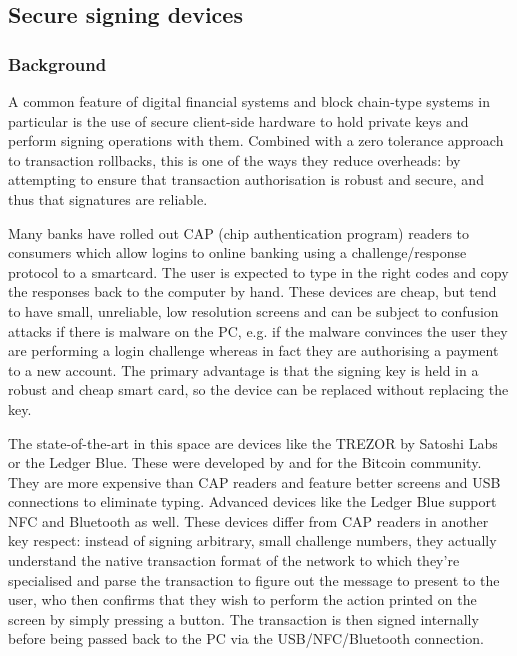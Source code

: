 \documentclass{article}
\begin{document}
\subsection{Secure signing devices}\label{sec:secure-signing-devices}

\subsubsection{Background}

A common feature of digital financial systems and block chain-type systems in particular is the use of secure
client-side hardware to hold private keys and perform signing operations with them. Combined with a zero tolerance
approach to transaction rollbacks, this is one of the ways they reduce overheads: by attempting to ensure that
transaction authorisation is robust and secure, and thus that signatures are reliable.

Many banks have rolled out CAP (chip authentication program) readers to consumers which allow logins to online
banking using a challenge/response protocol to a smartcard. The user is expected to type in the right codes and
copy the responses back to the computer by hand. These devices are cheap, but tend to have small, unreliable, low
resolution screens and can be subject to confusion attacks if there is malware on the PC, e.g. if the malware
convinces the user they are performing a login challenge whereas in fact they are authorising a payment to a new
account. The primary advantage is that the signing key is held in a robust and cheap smart card, so the device can
be replaced without replacing the key.

The state-of-the-art in this space are devices like the TREZOR\cite{TREZOR} by Satoshi Labs or the Ledger Blue.
These were developed by and for the Bitcoin community. They are more expensive than CAP readers and feature better
screens and USB connections to eliminate typing. Advanced devices like the Ledger Blue support NFC and Bluetooth as
well. These devices differ from CAP readers in another key respect: instead of signing arbitrary, small challenge
numbers, they actually understand the native transaction format of the network to which they're specialised and
parse the transaction to figure out the message to present to the user, who then confirms that they wish to perform
the action printed on the screen by simply pressing a button. The transaction is then signed internally before
being passed back to the PC via the USB/NFC/Bluetooth connection.
\end{document}
